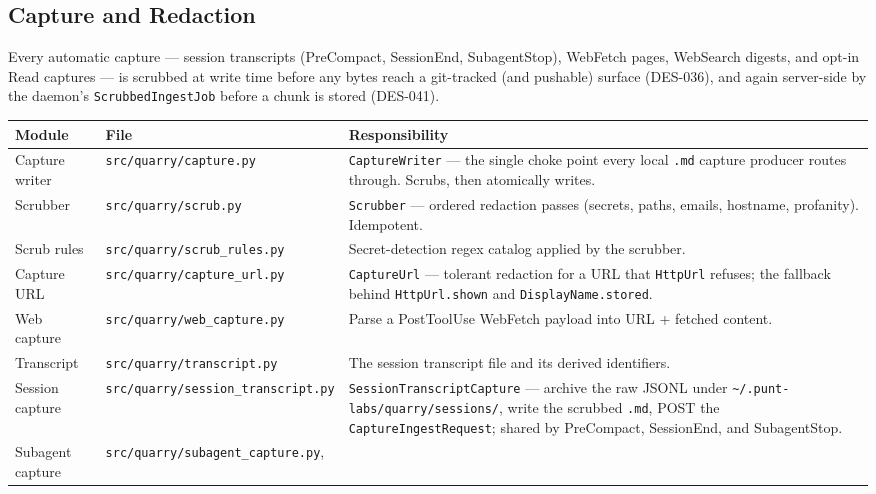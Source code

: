 \documentclass[a4paper,10pt]{article}
\newcommand{\modpath}[1]{\texttt{src/quarry/#1}}
\begin{document}
\subsection{Capture and Redaction}

Every automatic capture --- session transcripts (PreCompact, SessionEnd,
SubagentStop), WebFetch pages, WebSearch digests, and opt-in Read
captures --- is scrubbed at write time before any bytes reach a
git-tracked (and pushable) surface (DES-036), and again server-side by
the daemon's \texttt{ScrubbedIngestJob} before a chunk is stored
(DES-041).

\begin{center}
\begin{tabular}{llp{7cm}}
\toprule
\textbf{Module} & \textbf{File} & \textbf{Responsibility} \\
\midrule
Capture writer & \modpath{capture.py}       & \texttt{CaptureWriter} ---
                 the single choke point every local \texttt{.md} capture
                 producer routes through.  Scrubs, then atomically writes. \\
Scrubber       & \modpath{scrub.py}         & \texttt{Scrubber} ---
                 ordered redaction passes (secrets, paths, emails,
                 hostname, profanity).  Idempotent. \\
Scrub rules    & \modpath{scrub\_rules.py}  & Secret-detection regex
                 catalog applied by the scrubber. \\
Capture URL    & \modpath{capture\_url.py}  & \texttt{CaptureUrl} ---
                 tolerant redaction for a URL that \texttt{HttpUrl}
                 refuses; the fallback behind \texttt{HttpUrl.shown} and
                 \texttt{DisplayName.stored}. \\
Web capture    & \modpath{web\_capture.py}  & Parse a PostToolUse
                 WebFetch payload into URL + fetched content. \\
Transcript     & \modpath{transcript.py}    & The session transcript
                 file and its derived identifiers. \\
Session capture & \modpath{session\_transcript.py} &
                 \texttt{SessionTranscriptCapture} --- archive the raw
                 JSONL under \texttt{\~{}/.punt-labs/quarry/sessions/},
                 write the scrubbed \texttt{.md}, POST the
                 \texttt{CaptureIngestRequest}; shared by PreCompact,
                 SessionEnd, and SubagentStop. \\
Subagent capture & \modpath{subagent\_capture.py},

\end{tabular}
\end{center}
\end{document}
